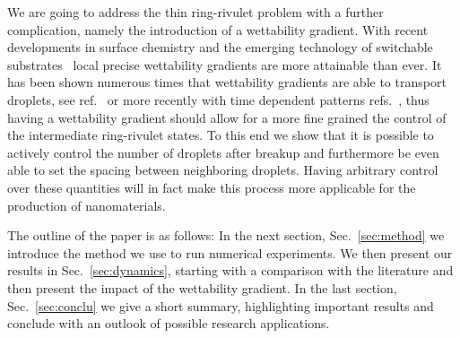 \documentclass[twoside,twocolumn,9pt]{article}
\begin{document}
We are going to address the thin ring-rivulet problem with a further complication, namely the introduction of a wettability gradient.
With recent developments in surface chemistry and the emerging technology of switchable substrates~\cite{xinReversiblySwitchableWettability2010, stuartEmergingApplicationsStimuliresponsive2010,chenThermalresponsiveHydrogelSurface2010, ichimuraLightDrivenMotionLiquids2000, mugeleElectrowettingConvenientWay2005} local precise wettability gradients are more attainable than ever.
It has been shown numerous times that wettability gradients are able to transport droplets, see ref.~\cite{liuActuatingWaterDroplets2015} or more recently with time dependent patterns refs.~\cite{grawitterSteeringDropletsSubstrates2021, zitzControllingDewettingMorphologies2023}, thus having a wettability gradient should allow for a more fine grained the control of the intermediate ring-rivulet states.
To this end we show that it is possible to actively control the number of droplets after breakup and furthermore be even able to set the spacing between neighboring droplets.
Having arbitrary control over these quantities will in fact make this process more applicable for the production of nanomaterials. 

The outline of the paper is as follows: In the next section, Sec.~\ref{sec:method} we introduce the method we use to run numerical experiments.
We then present our results in Sec.~\ref{sec:dynamics}, starting with a comparison with the literature and then present the impact of the wettability gradient.
In the last section, Sec.~\ref{sec:conclu} we give a short summary, highlighting important results and conclude with an outlook of possible research applications.
\end{document}
